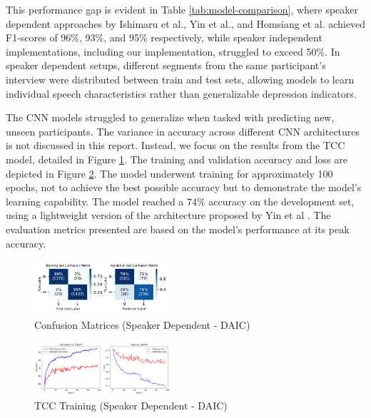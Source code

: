 This performance gap is evident in Table \ref{tab:model-comparison}, where speaker dependent approaches by Ishimaru et al., Yin et al., and Homsiang et al. achieved F1-scores of 96\%, 93\%, and 95\% respectively, while speaker independent implementations, including our implementation, struggled to exceed 50\%. In speaker dependent setups, different segments from the same participant's interview were distributed between train and test sets, allowing models to learn individual speech characteristics rather than generalizable depression indicators.

The CNN models struggled to generalize when tasked with predicting new, unseen participants. The variance in accuracy across different CNN architectures is not discussed in this report. Instead, we focus on the results from the TCC model, detailed in Figure \ref{fig:confusion_matrices_TCC_daic}.
The training and validation accuracy and loss are depicted in Figure \ref{fig:training_TCC_daic}. The model underwent training for approximately 100 epochs, not to achieve the best possible accuracy but to demonstrate the model’s learning capability.
The model reached a 74\% accuracy on the development set, using a lightweight version of the architecture proposed by Yin et al \cite{yin2023depression}. The evaluation metrics presented are based on the model's performance at its peak accuracy.

\begin{figure}[H]
    \centering
    \includegraphics[width=0.45\textwidth]{vis_pdf/TCC_FINAL.pdf} %
    \caption{Confusion Matrices (Speaker Dependent - DAIC)}
    \label{fig:confusion_matrices_TCC_daic}
\end{figure}

\begin{figure}[H]
    \centering
    \includegraphics[width=0.45\textwidth]{vis_pdf/TCC_model_perf.pdf}
    \caption{TCC Training (Speaker Dependent - DAIC)}
    \label{fig:training_TCC_daic}
\end{figure}



